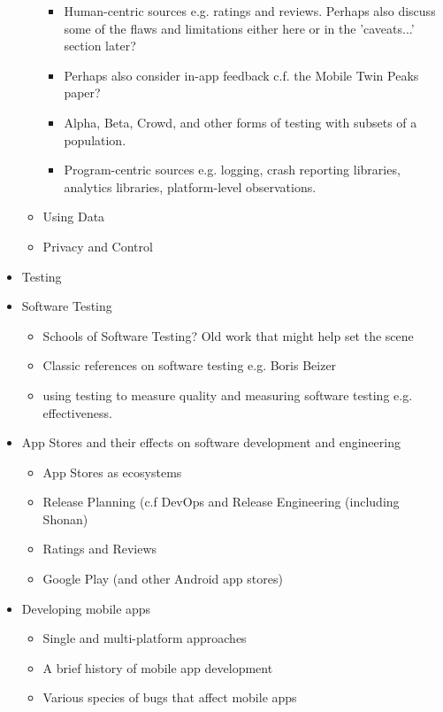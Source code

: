\begin{itemize}
\begin{itemize}
        \begin{itemize}
            \item Human-centric sources e.g. ratings and reviews. Perhaps also discuss some of the flaws and limitations either here or in the 'caveats...' section later?
            \item Perhaps also consider in-app feedback c.f. the Mobile Twin Peaks paper?
            \item Alpha, Beta, Crowd, and other forms of testing with subsets of a population.
            \item Program-centric sources e.g. logging, crash reporting libraries, analytics libraries, platform-level observations.
        \end{itemize}
        \item Using Data
        \item Privacy and Control
    \end{itemize}
    \item Testing
    \item Software Testing
    \begin{itemize}
        \item Schools of Software Testing? Old work that might help set the scene
        \item Classic references on software testing e.g. Boris Beizer
        \item using testing to measure quality and measuring software testing e.g. effectiveness.
    \end{itemize}
    \item App Stores and their effects on software development and engineering
    \begin{itemize}
        \item App Stores as ecosystems
        \item Release Planning (c.f DevOps and Release Engineering (including Shonan)
        \item Ratings and Reviews
        \item Google Play (and other Android app stores)
    \end{itemize}
    \item Developing mobile apps
    \begin{itemize}
        \item Single and multi-platform approaches
        \item A brief history of mobile app development
        \item Various species of bugs that affect mobile apps

\end{itemize}
\end{itemize}
